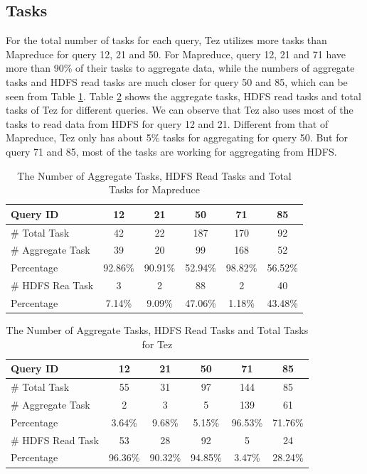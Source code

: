 \documentclass[10pt]{article}
\begin{document}
\subsection{Tasks}

For the total number of tasks for each query, Tez utilizes more tasks than Mapreduce for query 12, 21 and 50. For Mapreduce, query 12, 21 and 71 have more than 90\% of their tasks to aggregate data, while the numbers of aggregate tasks and HDFS read tasks are much closer for query 50 and 85, which can be seen from Table \ref{tab:mr_agg_task}. Table \ref{tab:tez_agg_task} shows the aggregate tasks, HDFS read tasks and total tasks of Tez for different queries. We can observe that Tez also uses  most of the tasks to read data from HDFS for query 12 and 21. Different from that of Mapreduce, Tez only has about 5\% tasks for aggregating for query 50. But for query 71 and 85, most of the tasks are working for aggregating from HDFS. 

\begin{table}[htbp]
  \centering
  \caption{The Number of Aggregate Tasks, HDFS Read Tasks and Total Tasks for Mapreduce}
    \begin{tabular}{lccccc}
    \toprule
    Query ID & 12    & 21    & 50    & 71    & 85 \\
    \midrule
    \# Total Task & 42    & 22    & 187   & 170   & 92 \\
    \# Aggregate Task & 39    & 20    & 99    & 168   & 52 \\
    Percentage & 92.86\% & 90.91\% & 52.94\% & 98.82\% & 56.52\% \\
    \# HDFS Rea Task & 3     & 2     & 88    & 2     & 40 \\
    Percentage & 7.14\% & 9.09\% & 47.06\% & 1.18\% & 43.48\% \\
    \bottomrule
    \end{tabular}%
  \label{tab:mr_agg_task}%
\end{table}%

\begin{table}[htbp]
  \centering
  \caption{The Number of Aggregate Tasks, HDFS Read Tasks and Total Tasks for Tez}
    \begin{tabular}{lccccc}
    \toprule
    Query ID & 12    & 21    & 50    & 71    & 85 \\
    \midrule
    \# Total Task & 55    & 31    & 97    & 144   & 85 \\
    \# Aggregate Task & 2     & 3     & 5     & 139   & 61 \\
    Percentage & 3.64\% & 9.68\% & 5.15\% & 96.53\% & 71.76\% \\
    \# HDFS Read Task & 53    & 28    & 92    & 5     & 24 \\
    Percentage & 96.36\% & 90.32\% & 94.85\% & 3.47\% & 28.24\% \\

    \bottomrule
    \end{tabular}%
  \label{tab:tez_agg_task}%
\end{table}%
\end{document}
